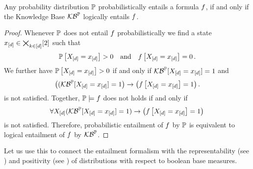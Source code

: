 \begin{theorem}\label{the:entailmentProbToLogical}
	Any probability distribution $\mathbb{P}$ probabilistically entails a formula $f$, if and only if the Knowledge Base $\mathcal{KB}^{\mathbb{P}}$ logically entails $f$.
\end{theorem}
\begin{proof}
	Whenever $\mathbb{P}$ does not entail $f$ probabilistically we find a state $x_{[d]}\in\bigtimes_{k\in[d]}[2]$ such that
		\[ \mathbb{P}\left[X_{[d]}=x_{[d]}\right] >0 \quad\text{and} \quad f\left[X_{[d]}=x_{[d]}\right] = 0 \, . \]
	We further have $\mathbb{P}\left[X_{[d]}=x_{[d]}\right] >0$ if and only if $\mathcal{KB}^{\mathbb{P}}[X_{[d]}=x_{[d]}]=1$ and
		\[ \big((\mathcal{KB}^{\mathbb{P}}[X_{[d]}=x_{[d]}]=1\big) \rightarrow \big(f\left[X_{[d]}=x_{[d]}\right]=1\big) \, . \]
	is not satisfied.
	Together, $\mathbb{P}\models f$ does not holds if and only if
		\[ \forall X_{[d]} (\mathcal{KB}^{\mathbb{P}}[X_{[d]}=x_{[d]}]=1) \rightarrow \big(f\left[X_{[d]}=x_{[d]}\right]=1\big) \,  \]
	is not satisfied. 
	Therefore, probabilistic entailment of $f$ by $\mathbb{P}$ is equivalent to logical entailment of $f$ by $\mathcal{KB}^{\mathbb{P}}$.
\end{proof}

Let us use this to connect the entailment formalism with the representability (see ) and positivity (see ) of distributions with respect to boolean base measures.

